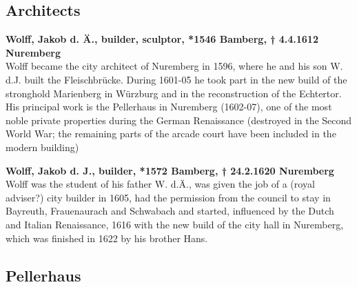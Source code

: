 \subsection{Architects}

\textbf{Wolff, Jakob d. Ä., builder, sculptor, *1546 Bamberg, † 4.4.1612 Nuremberg} \\
Wolff became the city architect of Nuremberg in 1596, where he and his son W. d.J. built the Fleischbrücke. During 1601-05 he took part in the new build of the stronghold Marienberg in Würzburg and in the reconstruction of the Echtertor. His principal work is the Pellerhaus in Nuremberg (1602-07), one of the most noble private properties during the German Renaissance (destroyed in the Second World War; the remaining parts of the arcade court have been included in the modern building)


\textbf{Wolff, Jakob d. J., builder, *1572 Bamberg, † 24.2.1620 Nuremberg} \\
Wolff was the student of his father W. d.Ä., was given the job of a (royal adviser?) city builder in 1605, had the permission from the council to stay in Bayreuth, Frauenaurach and Schwabach and started, influenced by the Dutch and Italian Renaissance, 1616 with the new build of the city hall in Nuremberg, which was finished in 1622 by his brother Hans.

\parencite[translated from German]{bookBayerischeBiographische}


\subsection{Pellerhaus}

